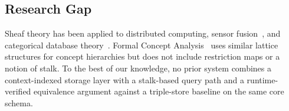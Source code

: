 \subsection{Research Gap}
\label{sec:motivation:gap}

Sheaf theory has been applied to distributed computing, sensor
fusion~\cite{robinson2017sheaves}, and categorical database
theory~\cite{spivak2012functorial}. Formal Concept Analysis~\cite{ganter1999formal}
uses similar lattice structures for concept hierarchies but does not include
restriction maps or a notion of stalk. To the best of our knowledge, no prior
system combines a context-indexed storage layer with a stalk-based query path
and a runtime-verified equivalence argument against a triple-store baseline on
the same core schema.
